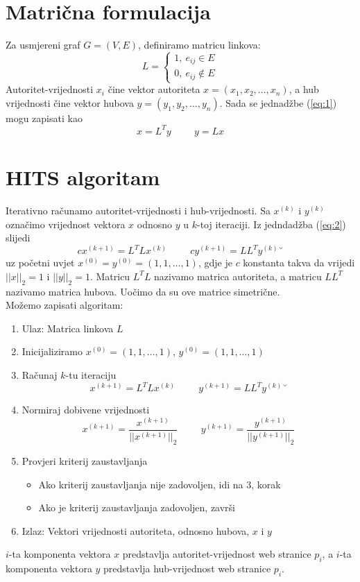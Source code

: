 \documentclass[11pt]{article}
\begin{document}
\section{Matrična formulacija}
Za usmjereni graf $G=(V,E)$, definiramo matricu linkova:
$$L = \begin{cases}
1,~e_{ij}\in E\\
0,~e_{ij}\not\in E
\end{cases}$$
Autoritet-vrijednosti $x_{i}$ čine vektor autoriteta $x = (x_{1}, x_{2}, \dots, x_{n})$, a hub vrijednosti čine vektor hubova $y = (y_{1}, y_{2}, \dots, y_{n})$.
Sada se jednadžbe (\ref{eq:1}) mogu zapisati kao
\begin{equation}\label{eq:2}
x = L^{T}y\hspace{1cm}y = Lx
\end{equation}

\section{HITS algoritam}
Iterativno računamo autoritet-vrijednosti i hub-vrijednosti.
Sa $x^{(k)}$ i $y^{(k)}$ označimo vrijednost vektora $x$ odnosno $y$ u $k$-toj iteraciji. Iz jedndadžba (\ref{eq:2}) slijedi
\begin{equation}
cx^{(k+1)} = L^{T}Lx^{(k)}\hspace{1cm} cy^{(k+1)} = LL^{T}y^{(k)}˘
\end{equation}
uz početni uvjet
$x^{(0)} = y^{(0)} = (1, 1, \dots, 1)$, gdje je $c$ konstanta takva da vrijedi $||x||_{2} =1$ i $||y||_{2} =1$. Matricu $L^{T}L$ nazivamo matrica autoriteta, a matricu $LL^{T}$ nazivamo matrica hubova. Uočimo da su ove matrice simetrične.\\
Možemo zapisati algoritam:
\begin{enumerate}
\item Ulaz: Matrica linkova $L$
\item Inicijaliziramo $x^{(0)} = (1,1,\dots,1)$, $y^{(0)} = (1,1,\dots,1)$
\item Računaj $k$-tu iteraciju 
\begin{equation*}
x^{(k+1)} = L^{T}Lx^{(k)}\hspace{1cm} y^{(k+1)} = LL^{T}y^{(k)}˘
\end{equation*}
\item Normiraj dobivene vrijednosti
\begin{equation*}
x^{(k+1)} = \frac{x^{(k+1)}}{||x^{(k+1)}||_{2}}\hspace{1cm}y^{(k+1)} = \frac{y^{(k+1)}}{||y^{(k+1)}||_{2}}
\end{equation*}
\item Provjeri kriterij zaustavljanja
\begin{itemize}
\item Ako kriterij zaustavljanja nije zadovoljen, idi na 3, korak
\item Ako je kriterij zaustavljanja zadovoljen, završi
\end{itemize}
\item Izlaz: Vektori vrijednosti autoriteta, odnosno hubova, $x$ i $y$
\end{enumerate}
$i$-ta komponenta vektora $x$ predstavlja autoritet-vrijednost web stranice $p_{i}$, a $i$-ta komponenta vektora $y$ predstavlja hub-vrijednost web stranice $p_{i}$.
\end{document}
